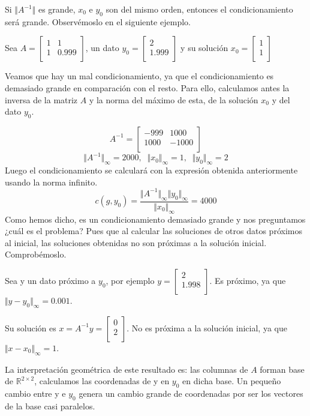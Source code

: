 Si $\Vert A^{-1} \Vert$ es grande, $x_0$ e $y_0$ son del mismo orden, entonces el condicionamiento será grande. Observémoslo en el siguiente ejemplo.

\begin{ejemplo}
Sea $A = \begin{bmatrix}
1 & 1 \\
1 & 0.999 \\
\end{bmatrix}$,
un dato $y_0 = \begin{bmatrix}
2 \\
1.999 \\
\end{bmatrix}$
y su solución $x_0 = \begin{bmatrix}
1 \\
1 \\
\end{bmatrix}$


Veamos que hay un mal condicionamiento, ya que el condicionamiento es demasiado grande en comparación con el resto. Para ello, calculamos antes la inversa de la matriz $A$ y la norma del máximo de esta, de la solución $x_0$ y del dato $y_0$.

\[ A^{-1} = \begin{bmatrix}
-999 & 1000 \\
1000 & -1000 \\
\end{bmatrix} \]
\[ \Vert A^{-1} \Vert _\infty = 2000, \; \; \Vert x_0 \Vert _\infty = 1, \; \; \Vert y_0 \Vert _\infty = 2 \]
Luego el condicionamiento se calculará con la expresión obtenida anteriormente usando la norma infinito.
\[ c(g, y_0) = \frac{\Vert A^{-1} \Vert _\infty \Vert y_0 \Vert _\infty }{\Vert x_0 \Vert _\infty } = 4000 \]
Como hemos dicho, es un condicionamiento demasiado grande y nos preguntamos ¿cuál es el problema? Pues que al calcular las soluciones de otros datos próximos al inicial, las soluciones obtenidas no son próximas a la solución inicial. Comprobémoslo.

Sea y un dato próximo a $y_0$, por ejemplo $y = \begin{bmatrix}
2 \\
1.998 \\
\end{bmatrix}$.
Es próximo, ya que $\Vert y - y_0 \Vert _\infty = 0.001$.

Su solución es $x = A^{-1}y = \begin{bmatrix}
0 \\
2 \\
\end{bmatrix}$. No es próxima a la solución inicial, ya que $\Vert x - x_0 \Vert _\infty = 1$.

La interpretación geométrica de este resultado es: las columnas de $A$ forman base de $\mathbb{R}^{2 \times 2}$, calculamos las coordenadas de y en $y_0$ en dicha base. Un pequeño cambio entre y e $y_0$ genera un cambio grande de coordenadas por ser los vectores de la base casi paralelos.
\end{ejemplo}

